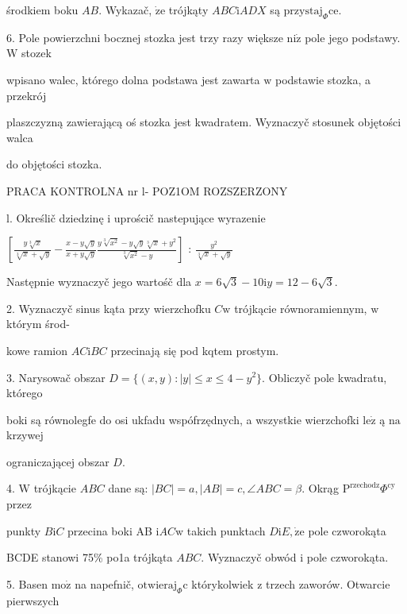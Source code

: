 \documentclass[a4paper,12pt]{article}
\begin{document}
środkiem boku $AB$. Wykazač, $\dot{\mathrm{z}}\mathrm{e}$ trójkąty $ABC\mathrm{i}ADX$ są $\mathrm{p}\mathrm{r}\mathrm{z}\mathrm{y}\mathrm{s}\mathrm{t}\mathrm{a}\mathrm{j}_{\Phi}\mathrm{c}\mathrm{e}.$

6. Pole powierzchni bocznej stozka jest trzy razy większe $\mathrm{n}\mathrm{i}\dot{\mathrm{z}}$ pole jego podstawy. $\mathrm{W}$ stozek

wpisano walec, którego dolna podstawa jest zawarta $\mathrm{w}$ podstawie stozka, a przekrój

plaszczyzną zawierającą oś stozka jest kwadratem. Wyznaczyč stosunek objętości walca

do objętości stozka.




PRACA KONTROLNA nr l- POZ1OM ROZSZERZONY

l. Określič dziedzinę i uprościč nastepujące wyrazenie

$[\displaystyle \frac{y\sqrt[3]{x}}{\sqrt[3]{x}+\sqrt{y}}-\frac{x-y\sqrt{y}}{x+y\sqrt{y}}\frac{y\sqrt[3]{x^{2}}-y\sqrt{y}\sqrt[3]{x}+y^{2}}{\sqrt[3]{x^{2}}-y}]$ : $\displaystyle \frac{y^{2}}{\sqrt[3]{x}+\sqrt{y}}$

Następnie wyznaczyč jego wartośč dla $x=6\sqrt{3}-10 \mathrm{i} y=12-6\sqrt{3}.$

2. Wyznaczyč sinus kąta przy wierzchofku $C\mathrm{w}$ trójkącie równoramiennym, $\mathrm{w}$ którym środ-

kowe ramion $AC\mathrm{i}BC$ przecinają się pod kqtem prostym.

3. Narysowač obszar $D = \{(x,y):|y|\leq x\leq 4-y^{2}\}$. Obliczyč pole kwadratu, którego

boki są równolegfe do osi ukfadu wspófrzędnych, a wszystkie wierzchofki $\mathrm{l}\mathrm{e}\dot{\mathrm{z}}$ ą $\mathrm{n}\mathrm{a}$ krzywej

ograniczającej obszar $D.$

4. $\mathrm{W}$ trójkącie $ABC$ dane są: $|BC|=a, |AB|=c, \angle ABC=\beta$. Okrąg $\mathrm{P}^{\mathrm{r}\mathrm{z}\mathrm{e}\mathrm{c}\mathrm{h}\mathrm{o}\mathrm{d}\mathrm{z}}\Phi^{\mathrm{c}\mathrm{y}}$ przez

punkty $B\mathrm{i}C$ przecina boki AB $\mathrm{i}AC\mathrm{w}$ takich punktach $D\mathrm{i}E, \dot{\mathrm{z}}\mathrm{e}$ pole czworokąta

BCDE stanowi 75\% po1a trójkąta $ABC$. Wyznaczyč obwód $\mathrm{i}$ pole czworokąta.

5. Basen $\mathrm{m}\mathrm{o}\dot{\mathrm{z}}$ na napefnič, $\mathrm{o}\mathrm{t}\mathrm{w}\mathrm{i}\mathrm{e}\mathrm{r}\mathrm{a}\mathrm{j}_{\Phi}\mathrm{c}$ którykolwiek $\mathrm{z}$ trzech zaworów. Otwarcie pierwszych
\end{document}
